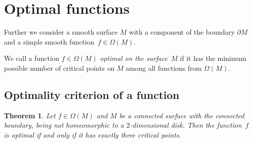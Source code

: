 \documentclass[10pt,a4paper]{amsart}
\numberwithin{equation}{section}
\newtheorem{Theorem}{Theorem}[section]
\begin{document}
\section{Optimal functions}

Further we consider a smooth surface $M$ with a component of the boundary $\partial M$ and a simple smooth function~$f\in\Omega(M)$.

\begin{Definition}\label{definition4.1}
We call a function $f\in\Omega(M)$ \emph{optimal on the surface}~$M$ if it has the minimum possible number of critical points on $M$ among all functions from $\Omega(M)$.
\end{Definition}

\subsection{Optimality criterion of a function}

\begin{Theorem}\label{theorem4.1}
Let $f\in\Omega(M)$ and $M$ be a connected surface with the connected boundary, being not homeomorphic to a $2$-dimensional disk. Then the function~$f$ is optimal if and only if it has exactly three critical points.
\end{Theorem}
\end{document}
